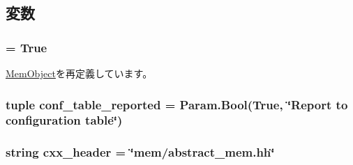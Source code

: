 \subsection{変数}
\hypertarget{classAbstractMemory_1_1AbstractMemory_a17fa61ac3806b481cafee5593b55e5d0}{
\subsubsection[{abstract}]{ = True}}
\label{classAbstractMemory_1_1AbstractMemory_a17fa61ac3806b481cafee5593b55e5d0}


\hyperlink{classMemObject_1_1MemObject_a17fa61ac3806b481cafee5593b55e5d0}{MemObject}を再定義しています。\hypertarget{classAbstractMemory_1_1AbstractMemory_a1d30f6c6ac50b7718dd64b8e7f9a0016}{
\subsubsection[{conf\_\-table\_\-reported}]{\setlength{\rightskip}{0pt plus 5cm}tuple {\bf conf\_\-table\_\-reported} = Param.Bool(True, \char`\"{}Report to configuration table\char`\"{})}}
\label{classAbstractMemory_1_1AbstractMemory_a1d30f6c6ac50b7718dd64b8e7f9a0016}
\hypertarget{classAbstractMemory_1_1AbstractMemory_a17da7064bc5c518791f0c891eff05fda}{
\subsubsection[{cxx\_\-header}]{\setlength{\rightskip}{0pt plus 5cm}string {\bf cxx\_\-header} = \char`\"{}mem/abstract\_\-mem.hh\char`\"{}}}
\label{classAbstractMemory_1_1AbstractMemory_a17da7064bc5c518791f0c891eff05fda}


